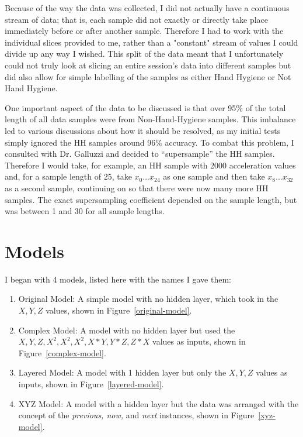 \documentclass[]{report}
\begin{document}
Because of the way the data was collected, I did not actually have a continuous stream of data; that is, each sample did not exactly or directly take place immediately before or after another sample. Therefore I had to work with the individual slices provided to me, rather than a "constant" stream of values I could divide up any way I wished. This split of the data meant that I unfortunately could not truly look at slicing an entire session's data into different samples but did also allow for simple labelling of the samples as either Hand Hygiene or Not Hand Hygiene.

One important aspect of the data to be discussed is that over 95\% of the total length of all data samples were from Non-Hand-Hygiene samples. This imbalance led to various discussions about how it should be resolved, as my initial tests simply ignored the HH samples around 96\% accuracy. To combat this problem, I consulted with Dr. Galluzzi and decided to ``supersample'' the HH samples. Therefore I would take, for example, an HH sample with 2000 acceleration values and, for a sample length of 25, take $x_{0} ... x_{24}$ as one sample and then take $x_{8} ... x_{32}$ as a second sample, continuing on so that there were now many more HH samples. The exact supersampling coefficient depended on the sample length, but was between 1 and 30 for all sample lengths.



\section{Models}

I began with 4 models, listed here with the names I gave them:
\begin{enumerate}
	\item Original Model: A simple model with no hidden layer, which took in the $X,Y,Z$ values, shown in Figure~\ref{original-model}.
	\item Complex Model: A model with no hidden layer but used the $X,Y,Z,X^{2},X^{2},X^{2},X*Y,Y*Z,Z*X$ values as inputs, shown in Figure~\ref{complex-model}.
	\item Layered Model: A model with 1 hidden layer but only the $X,Y,Z$ values as inputs, shown in Figure~\ref{layered-model}.
	\item XYZ Model: A model with a hidden layer but the data was arranged with the concept of the \textit{previous, now,} and \textit{next} instances, shown in Figure~\ref{xyz-model}.
\end{enumerate}
\end{document}
